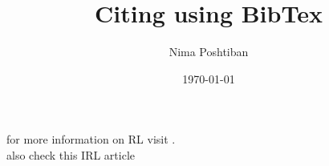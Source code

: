 \documentclass{article}
\author{Nima Poshtiban}
\date{\today}
\title{Citing using BibTex}
\begin{document}
\maketitle

for more information on RL visit \cite{andrew}.\\
also check this IRL article \cite{arora2021survey}

\end{document}
